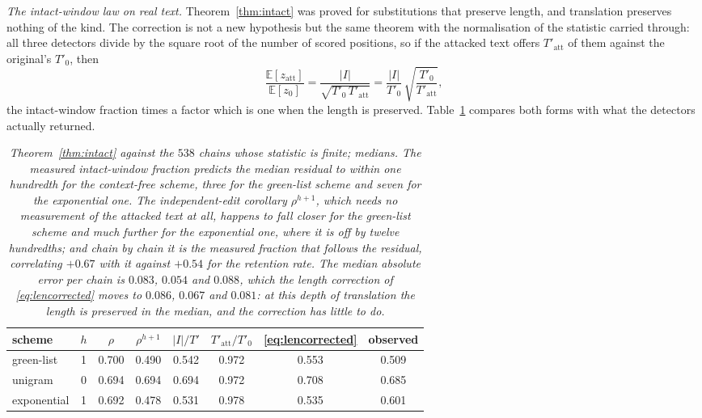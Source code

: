 \documentclass{article}
\theoremstyle{plain}
\theoremstyle{definition}
\numberwithin{equation}{section}
\begin{document}
\medskip
\noindent\emph{The intact-window law on real text.}
Theorem~\ref{thm:intact} was proved for substitutions that preserve
length, and translation preserves nothing of the kind. The correction is
not a new hypothesis but the same theorem with the normalisation of the
statistic carried through: all three detectors divide by the square root
of the number of scored positions, so if the attacked text offers
$T'_{\mathrm{att}}$ of them against the original's $T'_0$, then
\begin{equation}\label{eq:lencorrected}
\frac{\mathbb{E}[z_{\mathrm{att}}]}{\mathbb{E}[z_0]}
= \frac{|I|}{\sqrt{T'_0\,T'_{\mathrm{att}}}}
= \frac{|I|}{T'_0}\,\sqrt{\frac{T'_0}{T'_{\mathrm{att}}}},
\end{equation}
the intact-window fraction times a factor which is one when the length
is preserved. Table~\ref{tab:thmc} compares both forms with what the
detectors actually returned.

\begin{table}[t]
\centering
\small
\begin{tabular}{lccccccc}
\toprule
scheme & $h$ & $\rho$ & $\rho^{h+1}$ & $|I|/T'$ &
$T'_{\mathrm{att}}/T'_0$ & \eqref{eq:lencorrected} & observed\\
\midrule
green-list  & 1 & 0.700 & 0.490 & 0.542 & 0.972 & 0.553 & 0.509\\
unigram     & 0 & 0.694 & 0.694 & 0.694 & 0.972 & 0.708 & 0.685\\
exponential & 1 & 0.692 & 0.478 & 0.531 & 0.978 & 0.535 & 0.601\\
\bottomrule
\end{tabular}
\caption{\emph{Theorem~\ref{thm:intact} against the $538$ chains whose
statistic is finite; medians. The measured intact-window fraction
predicts the median residual to within one hundredth for the
context-free scheme, three for the green-list scheme and seven for the
exponential one. The independent-edit corollary $\rho^{h+1}$, which
needs no measurement of the attacked text at all, happens to fall closer
for the green-list scheme and much further for the exponential one,
where it is off by twelve hundredths; and chain by chain it is the
measured fraction that follows the residual, correlating $+0.67$ with it
against $+0.54$ for the retention rate. The median absolute error per
chain is $0.083$, $0.054$ and $0.088$, which the length correction of
\eqref{eq:lencorrected} moves to $0.086$, $0.067$ and $0.081$: at this
depth of translation the length is preserved in the median, and the
correction has little to do.}}
\label{tab:thmc}
\end{table}
\end{document}
